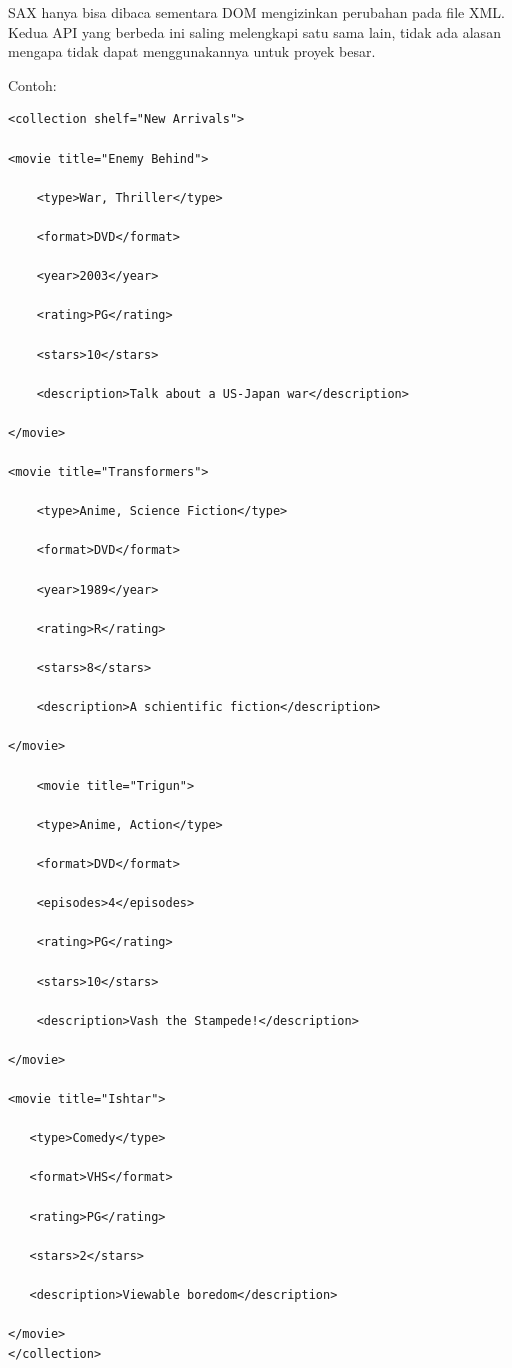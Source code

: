 \hspace*{0.5in} SAX hanya bisa dibaca sementara DOM mengizinkan perubahan pada file XML. Kedua API yang berbeda ini saling melengkapi satu sama lain, tidak ada alasan mengapa tidak dapat menggunakannya untuk proyek besar. 
\vspace{12pt}
 
Contoh: 
\begin{verbatim} 
<collection shelf="New Arrivals"> 
 
<movie title="Enemy Behind"> 
 
    <type>War, Thriller</type> 
 
    <format>DVD</format> 
 
    <year>2003</year> 
 
    <rating>PG</rating> 
 
    <stars>10</stars> 
 
    <description>Talk about a US-Japan war</description> 
 
</movie> 
 
<movie title="Transformers"> 
 
    <type>Anime, Science Fiction</type> 
 
    <format>DVD</format> 
 
    <year>1989</year> 
 
    <rating>R</rating> 
 
    <stars>8</stars> 
 
    <description>A schientific fiction</description> 
 
</movie> 
 
    <movie title="Trigun"> 
 
    <type>Anime, Action</type> 
 
    <format>DVD</format> 
 
    <episodes>4</episodes> 
 
    <rating>PG</rating> 
 
    <stars>10</stars> 
 
    <description>Vash the Stampede!</description> 
 
</movie> 
 
<movie title="Ishtar"> 
 
   <type>Comedy</type> 
 
   <format>VHS</format> 
 
   <rating>PG</rating> 
 
   <stars>2</stars> 
 
   <description>Viewable boredom</description> 
 
</movie> 
</collection>
\end{verbatim}
 
